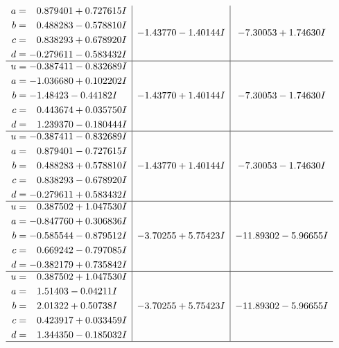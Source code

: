 \documentclass[1p]{elsarticle_modified}
\theoremstyle{definition}
\begin{document}
$$\begin{array}{c|c|c}
\begin{aligned}
a &= \phantom{-}0.879401 + 0.727615 I \\
b &= \phantom{-}0.488283 - 0.578810 I \\
c &= \phantom{-}0.838293 + 0.678920 I \\
d &= -0.279611 - 0.583432 I\end{aligned}
 & -1.43770 - 1.40144 I & -7.30053 + 1.74630 I \\ \hline\begin{aligned}
u &= -0.387411 - 0.832689 I \\
a &= -1.036680 + 0.102202 I \\
b &= -1.48423 - 0.44182 I \\
c &= \phantom{-}0.443674 + 0.035750 I \\
d &= \phantom{-}1.239370 - 0.180444 I\end{aligned}
 & -1.43770 + 1.40144 I & -7.30053 - 1.74630 I \\ \hline\begin{aligned}
u &= -0.387411 - 0.832689 I \\
a &= \phantom{-}0.879401 - 0.727615 I \\
b &= \phantom{-}0.488283 + 0.578810 I \\
c &= \phantom{-}0.838293 - 0.678920 I \\
d &= -0.279611 + 0.583432 I\end{aligned}
 & -1.43770 + 1.40144 I & -7.30053 - 1.74630 I \\ \hline\begin{aligned}
u &= \phantom{-}0.387502 + 1.047530 I \\
a &= -0.847760 + 0.306836 I \\
b &= -0.585544 - 0.879512 I \\
c &= \phantom{-}0.669242 - 0.797085 I \\
d &= -0.382179 + 0.735842 I\end{aligned}
 & -3.70255 + 5.75423 I & -11.89302 - 5.96655 I \\ \hline\begin{aligned}
u &= \phantom{-}0.387502 + 1.047530 I \\
a &= \phantom{-}1.51403 - 0.04211 I \\
b &= \phantom{-}2.01322 + 0.50738 I \\
c &= \phantom{-}0.423917 + 0.033459 I \\
d &= \phantom{-}1.344350 - 0.185032 I\end{aligned}
 & -3.70255 + 5.75423 I & -11.89302 - 5.96655 I\\
 \hline 

\end{array}$$
\end{document}
